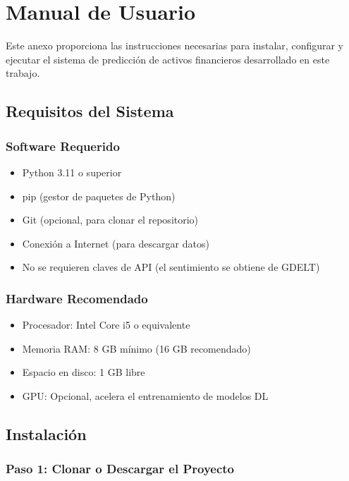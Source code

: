 \chapter{Manual de Usuario}
\label{ch:manual}

Este anexo proporciona las instrucciones necesarias para instalar, configurar y ejecutar el sistema de predicción de activos financieros desarrollado en este trabajo.

\section{Requisitos del Sistema}

\subsection{Software Requerido}
\begin{itemize}
    \item Python 3.11 o superior
    \item pip (gestor de paquetes de Python)
    \item Git (opcional, para clonar el repositorio)
    \item Conexión a Internet (para descargar datos)
    \item No se requieren claves de API (el sentimiento se obtiene de GDELT)
\end{itemize}

\subsection{Hardware Recomendado}
\begin{itemize}
    \item Procesador: Intel Core i5 o equivalente
    \item Memoria RAM: 8 GB mínimo (16 GB recomendado)
    \item Espacio en disco: 1 GB libre
    \item GPU: Opcional, acelera el entrenamiento de modelos DL
\end{itemize}

\section{Instalación}

\subsection{Paso 1: Clonar o Descargar el Proyecto}

